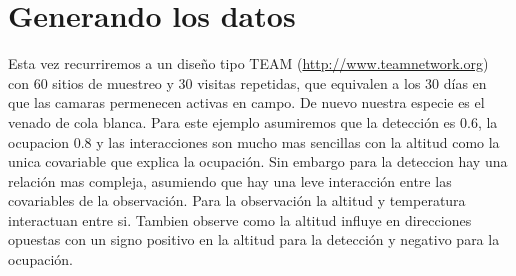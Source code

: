 \documentclass[]{book}
\begin{document}
\section{Generando los datos}\label{generando-los-datos}

Esta vez recurriremos a un diseño tipo TEAM
(\url{http://www.teamnetwork.org}) con 60 sitios de muestreo y 30
visitas repetidas, que equivalen a los 30 días en que las camaras
permenecen activas en campo. De nuevo nuestra especie es el venado de
cola blanca. Para este ejemplo asumiremos que la detección es 0.6, la
ocupacion 0.8 y las interacciones son mucho mas sencillas con la altitud
como la unica covariable que explica la ocupación. Sin embargo para la
deteccion hay una relación mas compleja, asumiendo que hay una leve
interacción entre las covariables de la observación. Para la observación
la altitud y temperatura interactuan entre si. Tambien observe como la
altitud influye en direcciones opuestas con un signo positivo en la
altitud para la detección y negativo para la ocupación.
\end{document}
